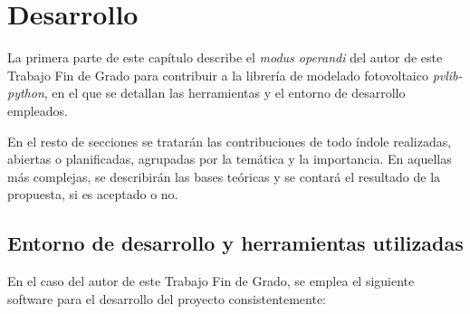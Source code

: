 \chapter{Desarrollo} \label{chp:desarrollo}

La primera parte de este capítulo describe el \textit{modus operandi} del autor de este Trabajo Fin de Grado para contribuir a la librería de modelado fotovoltaico \textit{pvlib-python}, en el que se detallan las herramientas y el entorno de desarrollo empleados.

En el resto de secciones se tratarán las contribuciones de todo índole realizadas, abiertas o planificadas, agrupadas por la temática y la importancia. En aquellas más complejas, se describirán las bases teóricas y se contará el resultado de la propuesta, si es aceptado o no.

\section{Entorno de desarrollo y herramientas utilizadas} \label{sct:desarrollo:entorno}

En el caso del autor de este Trabajo Fin de Grado, se emplea el siguiente software para el desarrollo del proyecto consistentemente:

